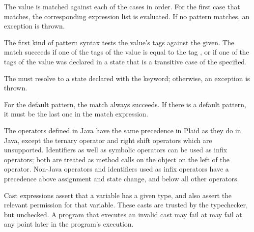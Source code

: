 The value is matched against each of the cases in order.  For the
first case that matches, the corresponding expression list is
evaluated.  If no pattern matches, an exception is
thrown.

The first kind of pattern syntax tests the value's tags against
the  given.  The match succeeds if
one of the tags of the value is equal to the tag
, or if one of the tags of the value
was declared in a state that is a transitive case of the
 specified.

The 
must resolve to a state declared with the 
keyword; otherwise, an exception is
thrown. 

For the default pattern, the match always succeeds.  If
there is a default pattern, it must be the last one in the match
expression.

\begin{quote}


 {}

 {}

 {}  



 {} \alt {}



 {} 

\end{quote}

The operators defined in Java have the same precedence in Plaid as
they do in Java, except the ternary operator and right shift operators 
which are unsupported.  Identifiers as well as symbolic operators can be
used as infix operators; both are treated as method calls on the
object on the left of the operator.  Non-Java operators and
identifiers used as infix operators have a precedence above assignment
and state change, and below all other operators.

Cast expressions assert that a variable has a given type, and
also assert the relevant permission for that variable.  These casts
are trusted by the typechecker, but unchecked. A program that executes 
an invalid cast may fail at may fail at any point later in the program's 
execution.


